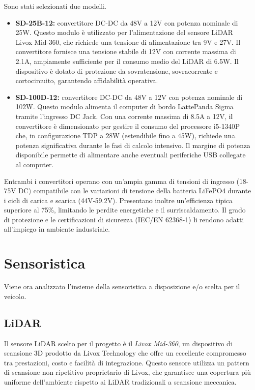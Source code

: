 Sono stati selezionati due modelli.
\begin{itemize}
    \item \textbf{SD-25B-12:} convertitore DC-DC da 48V a 12V con potenza nominale di 25W. Questo modulo è utilizzato per l'alimentazione del sensore LiDAR Livox Mid-360, che richiede una tensione di alimentazione tra 9V e 27V. Il convertitore fornisce una tensione stabile di 12V con corrente massima di 2.1A, ampiamente sufficiente per il consumo medio del LiDAR di 6.5W. Il dispositivo è dotato di protezione da sovratensione, sovracorrente e cortocircuito, garantendo affidabilità operativa.

    \item \textbf{SD-100D-12:} convertitore DC-DC da 48V a 12V con potenza nominale di 102W. Questo modulo alimenta il computer di bordo LattePanda Sigma tramite l'ingresso DC Jack. Con una corrente massima di 8.5A a 12V, il convertitore è dimensionato per gestire il consumo del processore i5-1340P che, in configurazione TDP a 28W (estendibile fino a 45W), richiede una potenza significativa durante le fasi di calcolo intensivo. Il margine di potenza disponibile permette di alimentare anche eventuali periferiche USB collegate al computer.
\end{itemize}

Entrambi i convertitori operano con un'ampia gamma di tensioni di ingresso (18-75V DC) compatibile con le variazioni di tensione della batteria LiFePO4 durante i cicli di carica e scarica (44V-59.2V). Presentano inoltre un'efficienza tipica superiore al 75\%, limitando le perdite energetiche e il surriscaldamento. Il grado di protezione e le certificazioni di sicurezza (IEC/EN 62368-1) li rendono adatti all'impiego in ambiente industriale.

\section{Sensoristica}

Viene ora analizzato l'insieme della sensoristica a disposizione e/o scelta per il veicolo.

\subsection{LiDAR}

Il sensore LiDAR scelto per il progetto è il \textit{Livox Mid-360}, un dispositivo di scansione 3D prodotto da Livox Technology che offre un eccellente compromesso tra prestazioni, costo e facilità di integrazione. Questo sensore utilizza un pattern di scansione non ripetitivo proprietario di Livox, che garantisce una copertura più uniforme dell'ambiente rispetto ai LiDAR tradizionali a scansione meccanica.

